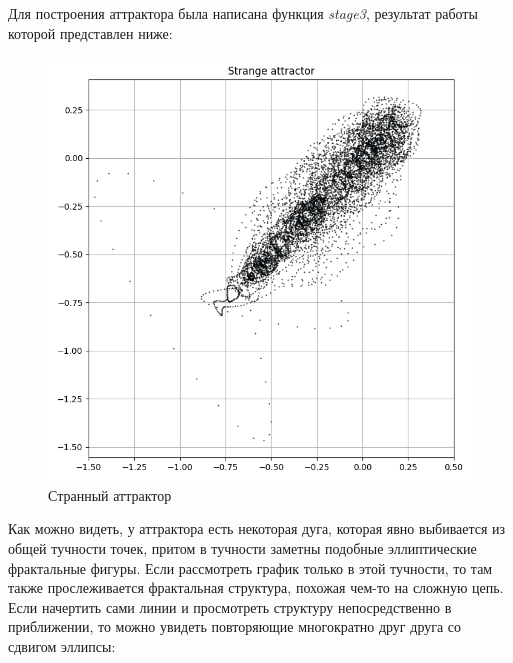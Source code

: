 \documentclass[12pt, oneside, a4paper]{article}
\begin{document}
Для построения аттрактора была написана функция \textit{stage3}, 
результат работы которой представлен ниже:
\begin{figure}[H]
    \caption {Странный аттрактор}
    \centerline{\includegraphics[scale = 1.0]{../results/sat1.png}}
\end{figure}
Как можно видеть, у аттрактора есть некоторая дуга, которая явно выбивается 
из общей тучности точек, притом в тучности заметны подобные эллиптические
фрактальные фигуры. Если рассмотреть график только в этой тучности, то там также
прослеживается фрактальная структура, похожая чем-то на сложную цепь.
Если начертить сами линии и просмотреть структуру непосредственно в приближении,
то можно увидеть повторяющие многократно друг друга со сдвигом эллипсы:
\end{document}
